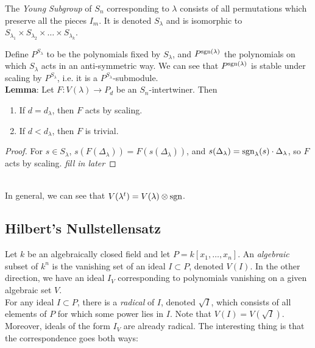 \documentclass{amsart}
\begin{document}
The \textit{Young Subgroup} of $S_n$ corresponding to $\lambda$ consists of all permutations which preserve all the pieces $I_m$. It is denoted $S_{\lambda}$ and is isomorphic to $S_{\lambda_1}\times S_{\lambda_2} \times \dots \times S_{\lambda_k}$.

Define $P^{S_{\lambda}}$ to be the polynomials fixed by $S_{\lambda}$, and $P^{\operatorname{sgn}(\lambda)}$ the polynomials on which $S_{\lambda}$ acts in an anti-symmetric way. We can see that $P^{\operatorname{sgn}(\lambda)}$ is stable under scaling by $P^{S_{\lambda}}$, i.e. it is a $P^{S_{\lambda}}$-submodule.\\

\textbf{Lemma}: Let $F:V(\lambda)\to P_d$ be an $S_n$-intertwiner. Then
\begin{enumerate}
	\item If $d=d_{\lambda}$, then $F$ acts by scaling.
	\item If $d<d_{\lambda}$, then $F$ is trivial.
\end{enumerate}
\begin{proof}
	For $s\in S_{\lambda}$, $s(F(\Delta_{\lambda})) = F(s(\Delta_{\lambda}))$, and $s(\Delta_{\lambda}) = \operatorname{sgn}_{\lambda}(s)\cdot \Delta_{\lambda}$, so $F$ acts by scaling. \textit{fill in later}
\end{proof}\\

In general, we can see that $V(\lambda^t) = V(\lambda)\otimes \operatorname{sgn}$.\\

\subsection{Hilbert's Nullstellensatz} 
Let $k$ be an algebraically closed field and let $P=k[x_1,\dots,x_n]$. An \textit{algebraic} subset of $k^n$ is the vanishing set of an ideal $I\subset P$, denoted $V(I)$. In the other direction, we have an ideal $I_V$ corresponding to polynomials vanishing on a given algebraic set $V$.\\

For any ideal $I\subset P$, there is a \textit{radical} of $I$, denoted $\sqrt{I}$, which consists of all elements of $P$ for which some power lies in $I$. Note that $V(I)=V(\sqrt{I})$. Moreover, ideals of the form $I_V$ are already radical. The interesting thing is that the correspondence goes both ways:\\
\end{document}
